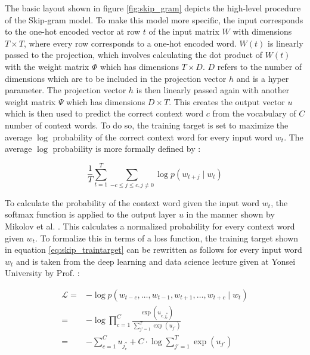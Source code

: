 	\noindent The basic layout shown in figure \ref{fig:skip_gram} depicts the
	high-level procedure of the Skip-gram model. To make this model more
	specific, the input corresponds to the one-hot encoded vector at row $t$ of
	the input matrix $W$ with dimensions $T \times T$, where every row 
	corresponds to a one-hot encoded word. $W(t)$ is linearly passed to the
	projection, which involves calculating the dot product of $W(t)$ with the 
	weight matrix $\Phi$ which has dimensions $T \times D$. $D$ refers to the
	number of dimensions which are to be included in the projection vector $h$ 
	and is a hyper parameter. The projection vector $h$ is then linearly passed
	again with another weight matrix $\Psi$ which has dimensions $D \times T$.
	This creates the output vector $u$ which is then used to predict the correct
	context word $c$ from the vocabulary of $C$ number of context words. To do 
	so, the training target is set to maximize the average $\log$ probability 
	of the correct context word for every input word $w_{t}$. 
	\newpage
	\noindent The average $\log$ probability is more formally defined by 
	\citep[p. 2]{mikolov2013distributed}:

	\begin{equation}
		\frac{1}{T}\sum_{t=1}^{T}\sum_{-c \leqslant j \leqslant c,j\neq0}\log
		p(w_{t+j}\mid w_{t})
		\label{eq:skip_traintarget}
	\end{equation}

	\noindent To calculate the probability of the context word given the input
	word $w_{t}$, the softmax function
	\citep{bridle1990probabilistic,bridle1990training} is applied to the output 
	layer $u$ in the manner shown by Mikolov et al. 
	\citeyearpar[p. 3]{mikolov2013distributed}. This calculates a normalized 
	probability for every context word given $w_{t}$. To formalize this in 
	terms of a loss function, the training target shown in equation 
	\ref{eq:skip_traintarget} can be rewritten as follows for every input word 
	$w_{t}$ and is taken from the deep learning and data science lecture given
	at Yonsei University by Prof. \cite{won2021lecture}: 

	\begin{equation}
		\begin{split}
		\mathcal{L} =& - \log p(w_{t-c},\dots,w_{t-1},w_{t+1},\dots,w_{t+c}\mid w_{t})\\
			=& - \log \prod_{c=1}^{C}\frac{\exp(u_{c,j_{c}^{*}})}{\sum_{j'=1}^{T}
			\exp(u_{j'})}\\
			=&	- \sum_{c=1}^{C} u_{j_{c}^{*}} + C \cdot \log
								\sum_{j'=1}^{T} \exp(u_{j'})
		\label{eq:deepwalk_loss}
	\end{split}
	\end{equation}

